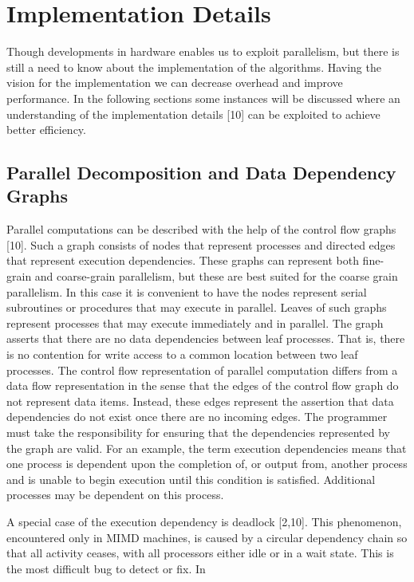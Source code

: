 \chapter{Implementation Details}
Though developments in hardware enables us to exploit parallelism, but there is still a need to know about the implementation of the algorithms. Having the
vision for the implementation we can decrease overhead and improve performance. In the following sections some instances will be discussed where an
understanding of the implementation details [10] can be exploited to achieve better efficiency.

\section{Parallel Decomposition and Data Dependency Graphs}
Parallel computations can be described with the help of the control flow graphs [10]. Such a graph consists of nodes that represent processes and directed
edges that represent execution dependencies. These graphs can represent both fine-grain and coarse-grain parallelism, but these are best suited for the coarse
grain parallelism. In this case it is convenient to have the nodes represent serial subroutines or procedures that may execute in parallel. Leaves of such
graphs represent processes that may execute immediately and in parallel. The graph asserts that there are no data dependencies between leaf processes. That is,
there is no contention for write access to a common location between two leaf processes. The control flow representation of parallel computation differs from a
data flow representation in the sense that the edges of the control flow graph do not represent data items. Instead, these edges represent the assertion that
data
dependencies do not exist once there are no incoming edges. The programmer must take the responsibility for ensuring that the dependencies represented by the
graph are valid. For an example, the term execution dependencies means that one process is dependent upon the completion of, or output from, another process
and is unable to begin execution until this condition is satisfied. Additional processes may be dependent on this process. \par
\hspace{1in} A special case of the execution dependency is deadlock [2,10]. This phenomenon, encountered only in MIMD machines, is caused by a circular
dependency chain so that all activity ceases, with all processors either idle or in a wait state. This is the most difficult bug to detect or fix. In
